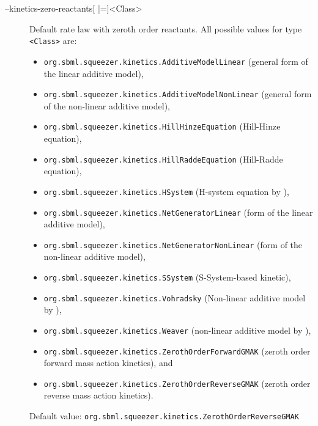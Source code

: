 \begin{description}
\item[--kinetics-zero-reactants{[} |={]}<Class>]
  Default rate law with zeroth order reactants.
  All possible values for type \texttt{<Class>} are:
  \begin{itemize}
  \item\texttt{org.sbml.squeezer.kinetics.AdditiveModelLinear} (general form of the linear additive model),
  \item\texttt{org.sbml.squeezer.kinetics.AdditiveModelNonLinear} (general form of the non-linear additive model),
  \item\texttt{org.sbml.squeezer.kinetics.HillHinzeEquation} (Hill-Hinze equation), 
  \item\texttt{org.sbml.squeezer.kinetics.HillRaddeEquation} (Hill-Radde equation),
  \item\texttt{org.sbml.squeezer.kinetics.HSystem} (H-system equation by \citealp{Spieth2006}),
  \item\texttt{org.sbml.squeezer.kinetics.NetGeneratorLinear} (\NetGenerator form of the linear additive model),
  \item\texttt{org.sbml.squeezer.kinetics.NetGeneratorNonLinear} (\NetGenerator form of the non-linear additive model),
  \item\texttt{org.sbml.squeezer.kinetics.SSystem} (S-System-based kinetic),
  \item\texttt{org.sbml.squeezer.kinetics.Vohradsky} (Non-linear additive model by \citealp*{Vu2007}),
  \item\texttt{org.sbml.squeezer.kinetics.Weaver} (non-linear additive model by \citealp{Weaver1999}),
  \item\texttt{org.sbml.squeezer.kinetics.ZerothOrderForwardGMAK} (zeroth order forward mass action kinetics), and
  \item\texttt{org.sbml.squeezer.kinetics.ZerothOrderReverseGMAK} (zeroth order reverse mass action kinetics).
  \end{itemize}
  Default value: \texttt{org.sbml.squeezer.kinetics.ZerothOrderReverseGMAK}


\end{description}
